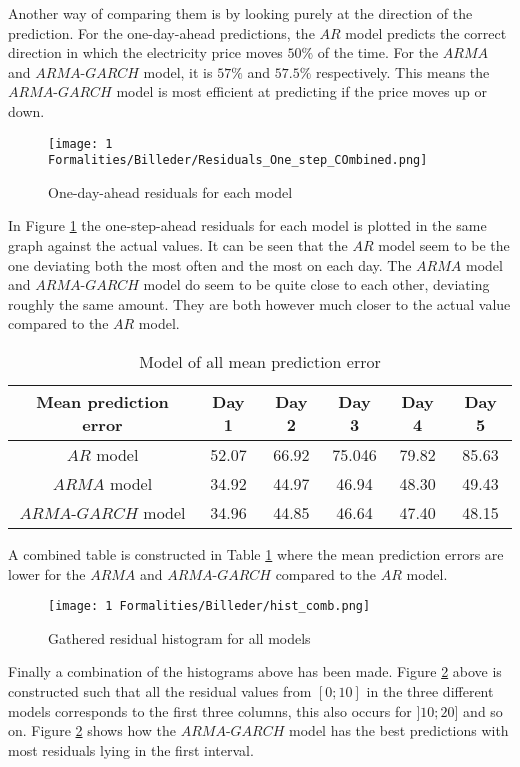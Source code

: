 Another way of comparing them is by looking purely at the direction of the prediction. For the one-day-ahead predictions, the $AR$ model predicts the correct direction in which the electricity price moves $50\%$ of the time. For the $ARMA$ and $ARMA$-$GARCH$ model, it is $57\%$ and $57.5\%$ respectively. This means the $ARMA$-$GARCH$ model is most efficient at predicting if the price moves up or down.
\begin{figure}[H]
    \centering
    \texttt{[image: 1 Formalities/Billeder/Residuals\_One\_step\_COmbined.png]}
    \caption{One-day-ahead residuals for each model}
    \label{fig:Residuals_One_step_Combined}
\end{figure}
\noindent In Figure \ref{fig:Residuals_One_step_Combined} the one-step-ahead residuals for each model is plotted in the same graph against the actual values. It can be seen that the $AR$ model seem to be the one deviating both the most often and the most on each day. The $ARMA$ model and $ARMA$-$GARCH$ model do seem to be quite close to each other, deviating roughly the same amount. They are both however much closer to the actual value compared to the $AR$ model. 

\begin{table}[H]
    \centering
  \begin{tabular}{|c|c|c|c|c|c|}
    \hline
   Mean prediction error & Day 1 & Day 2 & Day 3 & Day 4 & Day 5 \\
    \hline
    $AR$ model& 52.07 & 66.92 & 75.046 & 79.82 & 85.63   \\
    \hline
   $ARMA$ model& 34.92 & 44.97 & 46.94 & 48.30 & 49.43  \\
    \hline
    $ARMA$-$GARCH$ model & 34.96 & 44.85 & 46.64 & 47.40 & 48.15  \\
    \hline
  \end{tabular}
  \caption{Model of all mean prediction error}
\label{tab:combi_mean_prediction_error}
\end{table}
\noindent A combined table is constructed in Table \ref{tab:combi_mean_prediction_error} where the mean prediction errors are lower for the $ARMA$ and $ARMA$-$GARCH$ compared to the $AR$ model.
\begin{figure}[H]
    \centering
    \texttt{[image: 1 Formalities/Billeder/hist\_comb.png]}
    \caption{Gathered residual histogram for all models} \label{fig:Histogram_residuals_combi_model}
\end{figure}
\noindent Finally a combination of the histograms above has been made. Figure \ref{fig:Histogram_residuals_combi_model} above is constructed such that all the residual values from $[0;10]$ in the three different models corresponds to the first three columns, this also occurs for $]10;20]$ and so on. Figure \ref{fig:Histogram_residuals_combi_model} shows how the $ARMA$-$GARCH$ model has the best predictions with most residuals lying in the first interval.


